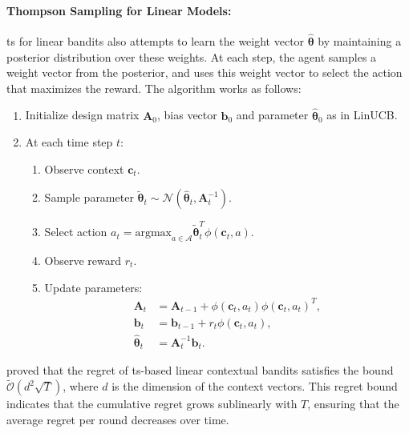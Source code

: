 \paragraph{Thompson Sampling for Linear Models:} \acf{ts} for linear bandits \citep{agrawal2013thompson} also attempts to learn the weight vector $\hat{\boldsymbol{\theta}}$ by maintaining a posterior distribution over these weights. At each step, the agent samples a weight vector from the posterior, and uses this weight vector to select the action that maximizes the reward. The algorithm works as follows:
    \begin{enumerate}
    \item Initialize design matrix $\mathbf{A}_0$, bias vector $\mathbf{b}_0$ and parameter $\hat{\boldsymbol{\theta}}_0$ as in LinUCB. 
    \item At each time step $t$:
      \begin{enumerate}
        \item Observe context $\mathbf{c}_t$.
        \item Sample parameter $\widetilde{\boldsymbol{\theta}}_t \sim \mathcal{N}(\hat{\boldsymbol{\theta}}_t, \mathbf{A}_t^{-1})$. 
        \item Select action $a_t = \text{argmax}_{a \in \mathcal{A}} \widetilde{\boldsymbol{\theta}}_t^T \phi(\mathbf{c}_t, a)$.
        \item Observe reward $r_t$.
        \item Update parameters:
              \begin{align*}
                  \mathbf{A}_t &= \mathbf{A}_{t-1} + \phi(\mathbf{c}_t, a_t) \phi(\mathbf{c}_t, a_t)^T, \\
                  \mathbf{b}_t &= \mathbf{b}_{t-1} + r_t \phi(\mathbf{c}_t, a_t), \\
                  \hat{\boldsymbol{\theta}}_t &= \mathbf{A}_t^{-1} \mathbf{b}_t.
              \end{align*}
      \end{enumerate}
    \end{enumerate}
\citet{agrawal2013thompson} proved that the regret of \ac{ts}-based linear contextual bandits satisfies the bound $\tilde{\mathcal{O}}(d^2 \sqrt{T})$, where \( d \) is the dimension of the context vectors. This regret bound indicates that the cumulative regret grows sublinearly with \( T \), ensuring that the average regret per round decreases over time. 

